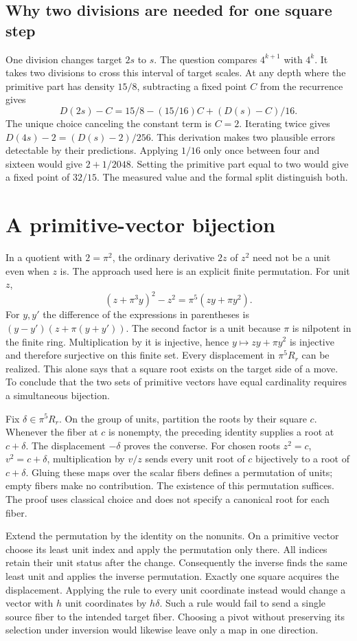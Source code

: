 \documentclass[12pt,letterpaper]{article}
\begin{document}
\subsection{Why two divisions are needed for one square step}
One division changes target $2s$ to $s$. The question compares $4^{k+1}$ with $4^k$. It takes two divisions to cross this interval of target scales. At any depth where the primitive part has density $15/8$, subtracting a fixed point $C$ from the recurrence gives
\[
       D(2s)-C = 15/8-(15/16)C + (D(s)-C)/16.
\]
The unique choice canceling the constant term is $C=2$. Iterating twice gives $D(4s)-2=(D(s)-2)/256$. This derivation makes two plausible errors detectable by their predictions. Applying $1/16$ only once between four and sixteen would give $2+1/2048$. Setting the primitive part equal to two would give a fixed point of $32/15$. The measured value and the formal split distinguish both.

\section{A primitive-vector bijection}
In a quotient with $2=\pi^2$, the ordinary derivative $2z$ of $z^2$ need not be a unit even when $z$ is. The approach used here is an explicit finite permutation. For unit $z$,
\[
       (z+\pi^3y)^2-z^2=\pi^5(zy+\pi y^2).
\]
For $y,y'$ the difference of the expressions in parentheses is $(y-y')(z+\pi(y+y'))$. The second factor is a unit because $\pi$ is nilpotent in the finite ring. Multiplication by it is injective, hence $y\mapsto zy+\pi y^2$ is injective and therefore surjective on this finite set. Every displacement in $\pi^5R_r$ can be realized. This alone says that a square root exists on the target side of a move. To conclude that the two sets of primitive vectors have equal cardinality requires a simultaneous bijection.

Fix $\delta\in\pi^5R_r$. On the group of units, partition the roots by their square $c$. Whenever the fiber at $c$ is nonempty, the preceding identity supplies a root at $c+\delta$. The displacement $-\delta$ proves the converse. For chosen roots $z^2=c$, $v^2=c+\delta$, multiplication by $v/z$ sends every unit root of $c$ bijectively to a root of $c+\delta$. Gluing these maps over the scalar fibers defines a permutation of units; empty fibers make no contribution. The existence of this permutation suffices. The proof uses classical choice and does not specify a canonical root for each fiber.

Extend the permutation by the identity on the nonunits. On a primitive vector choose its least unit index and apply the permutation only there. All indices retain their unit status after the change. Consequently the inverse finds the same least unit and applies the inverse permutation. Exactly one square acquires the displacement. Applying the rule to every unit coordinate instead would change a vector with $h$ unit coordinates by $h\delta$. Such a rule would fail to send a single source fiber to the intended target fiber. Choosing a pivot without preserving its selection under inversion would likewise leave only a map in one direction.
\end{document}
